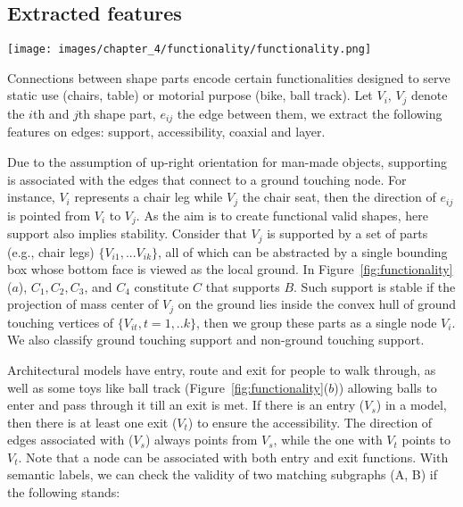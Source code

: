 \subsection{Extracted features}

\begin{figure*}[t!]
	\centering
		\texttt{[image: images/chapter\_4/functionality/functionality.png]}\\
	\caption{Functionality. (a) shape part C supports B; (b) A ball track model has an entry and an exit, and layers can be counted starting from ground touching nodes; (c) B and C share the common axis $S_2$. }
	\label{fig:functionality}
\end{figure*}

Connections between shape parts encode certain functionalities designed to serve static use (chairs, table) or motorial purpose (bike, ball track). Let $V_i$, $V_j$ denote the $i$th and $j$th shape part, $e_{ij}$ the edge between them, we extract the following features on edges: support, accessibility, coaxial and layer.

 Due to the assumption of up-right orientation for man-made objects, supporting is associated with the edges that connect to a ground touching node. For instance, $V_i$ represents a chair leg while $V_j$ the chair seat, then the direction of $e_{ij}$ is pointed from $V_i$ to $V_j$. As the aim is to create functional valid shapes, here support also implies stability. Consider that $V_j$ is supported by a set of parts (e.g., chair legs) $\{V_{i1}, ... V_{ik}\}$, all of which can be abstracted by a single bounding box whose bottom face is viewed as the local ground. In Figure~\ref{fig:functionality}($a$), $C_1, C_2, C_3$, and $C_4$ constitute $C$ that supports $B$. Such support is stable if the projection of mass center of $V_j$ on the ground lies inside the convex hull of ground touching vertices of $\{V_{it}, t = 1,..k\}$, then we group these parts as a single node $V_i$. We also classify ground touching support and non-ground touching support.

 Architectural models have entry, route and exit for people to walk through, as well as some toys like ball track (Figure~\ref{fig:functionality}($b$)) allowing balls to enter and pass through it till an exit is met. If there is an entry ($V_s$) in a model, then there is at least one exit ($V_t$) to ensure the accessibility. The direction of edges associated with ($V_s$) always points from $V_s$, while the one with $V_t$ points to $V_t$. Note that a node can be associated with both entry and exit functions. With semantic labels, we can check the validity of two matching subgraphs (A, B) if the following stands:

